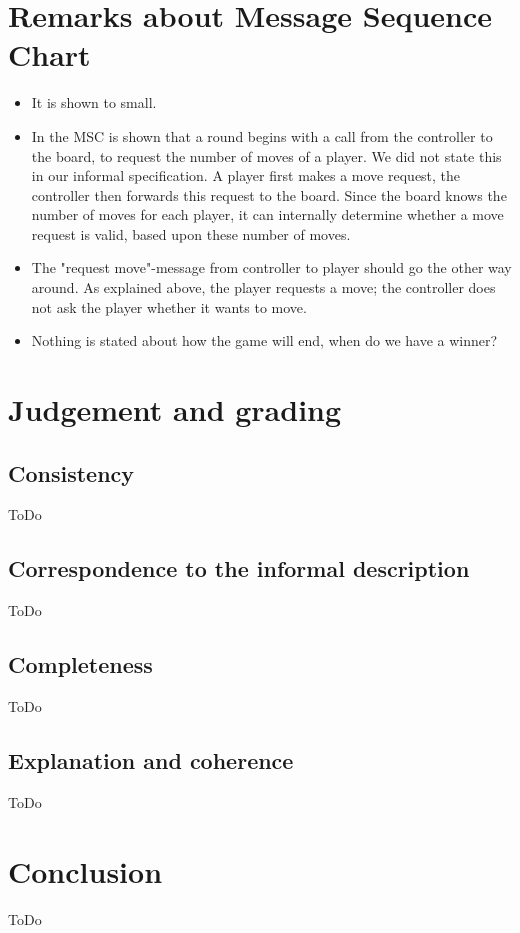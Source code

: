 \documentclass[a4paper,11pt]{article}
\begin{document}
    \section{Remarks about Message Sequence Chart}
    \begin{itemize}
        \item It is shown to small.
        \item In the MSC is shown that a round begins with a call from the controller to the board, to request the number of moves of a player. We did not state this in our informal specification. A player first makes a move request, the controller then forwards this request to the board. Since the board knows the number of moves for each player, it can internally determine whether a move request is valid, based upon these number of moves.
        \item The "request move"-message from controller to player should go the other way around. As explained above, the player requests a move; the controller does not ask the player whether it wants to move.
        \item Nothing is stated about how the game will end, when do we have a winner?
    \end{itemize}
    

    \section{Judgement and grading}
    \subsection{Consistency}
    ToDo

    \subsection{Correspondence to the informal description}
    ToDo

    \subsection{Completeness}
    ToDo

    \subsection{Explanation and coherence}
    ToDo
    
    \section{Conclusion}
    ToDo
\end{document}
